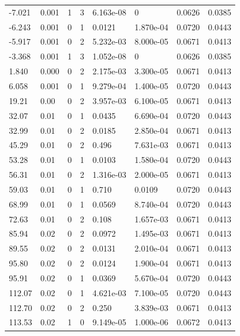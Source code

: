 \documentclass[preview]{standalone}
\begin{document}
{{\begin{tabular}{L{1.2cm}C{1.2cm} C{0.3cm}C{0.5cm} C{1.4cm}C{1.4cm} C{1.4cm}C{1.4cm}}
  -7.021  &  0.001  & 1     &  3 &  6.163e-08  & 0  & 0.0626 &  0.0385   \\ 
  -6.243  &  0.001  & 0     &  1 &  0.0121  & 1.870e-04  & 0.0720 &  0.0443   \\ 
  -5.917  &  0.001  & 0     &  2 &  5.232e-03  & 8.000e-05  & 0.0671 &  0.0413   \\ 
  -3.368  &  0.001  & 1     &  3 &  1.052e-08  & 0  & 0.0626 &  0.0385   \\ 
  1.840  &  0.000  & 0     &  2 &  2.175e-03  & 3.300e-05  & 0.0671 &  0.0413   \\ 
  6.058  &  0.001  & 0     &  1 &  9.279e-04  & 1.400e-05  & 0.0720 &  0.0443   \\ 
  19.21  &  0.00  & 0     &  2 &  3.957e-03  & 6.100e-05  & 0.0671 &  0.0413   \\ 
  32.07  &  0.01  & 0     &  1 &  0.0435  & 6.690e-04  & 0.0720 &  0.0443   \\ 
  32.99  &  0.01  & 0     &  2 &  0.0185  & 2.850e-04  & 0.0671 &  0.0413   \\ 
  45.29  &  0.01  & 0     &  2 &  0.496  & 7.631e-03  & 0.0671 &  0.0413   \\ 
  53.28  &  0.01  & 0     &  1 &  0.0103  & 1.580e-04  & 0.0720 &  0.0443   \\ 
  56.31  &  0.01  & 0     &  2 &  1.316e-03  & 2.000e-05  & 0.0671 &  0.0413   \\ 
  59.03  &  0.01  & 0     &  1 &  0.710  & 0.0109  & 0.0720 &  0.0443   \\ 
  68.99  &  0.01  & 0     &  1 &  0.0569  & 8.740e-04  & 0.0720 &  0.0443   \\ 
  72.63  &  0.01  & 0     &  2 &  0.108  & 1.657e-03  & 0.0671 &  0.0413   \\ 
  85.94  &  0.02  & 0     &  2 &  0.0972  & 1.495e-03  & 0.0671 &  0.0413   \\ 
  89.55  &  0.02  & 0     &  2 &  0.0131  & 2.010e-04  & 0.0671 &  0.0413   \\ 
  95.80  &  0.02  & 0     &  2 &  0.0124  & 1.900e-04  & 0.0671 &  0.0413   \\ 
  95.91  &  0.02  & 0     &  1 &  0.0369  & 5.670e-04  & 0.0720 &  0.0443   \\ 
  112.07  &  0.02  & 0     &  1 &  4.621e-03  & 7.100e-05  & 0.0720 &  0.0443   \\ 
  112.70  &  0.02  & 0     &  2 &  0.250  & 3.839e-03  & 0.0671 &  0.0413   \\ 
  113.53  &  0.02  & 1     &  0 &  9.149e-05  & 1.000e-06  & 0.0672 &  0.0413   \\ 

\end{tabular}}}
\end{document}
